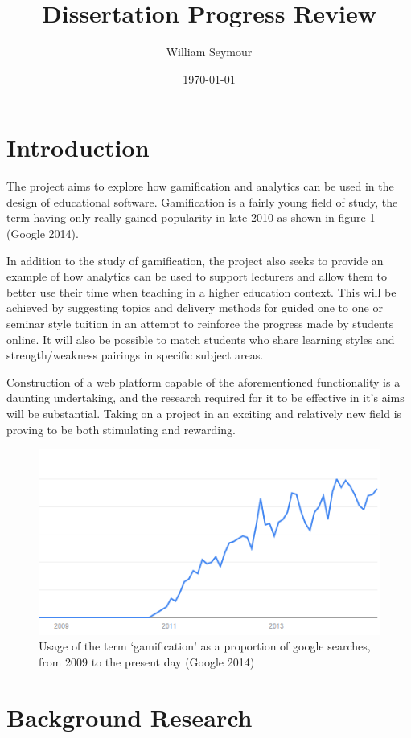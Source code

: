 \documentclass[10pt,a4paper]{report}
\author{William Seymour}
\title{Dissertation Progress Review}
\date{\today}
\begin{document}
\maketitle

\section*{Introduction}
The project aims to explore how gamification and analytics can be used in the design of educational software. Gamification is a fairly young field of study, the term having only really gained popularity in late 2010 as shown in figure \ref{usage} (Google 2014).

In addition to the study of gamification, the project also seeks to provide an example of how analytics can be used to support lecturers and allow them to better use their time when teaching in a higher education context. This will be achieved by suggesting topics and delivery methods for guided one to one or seminar style tuition in an attempt to reinforce the progress made by students online. It will also be possible to match students who share learning styles and strength/weakness pairings in specific subject areas.

Construction of a web platform capable of the aforementioned functionality is a daunting undertaking, and the research required for it to be effective in it's aims will be substantial. Taking on a project in an exciting and relatively new field is proving to be both stimulating and rewarding.
\begin{figure}
	\includegraphics{../img/usage-graph.png}
	\caption{Usage of the term `gamification' as a proportion of google searches, from 2009 to the present day (Google 2014)}
	\label{usage}
\end{figure}
\section*{Background Research}
\end{document}
